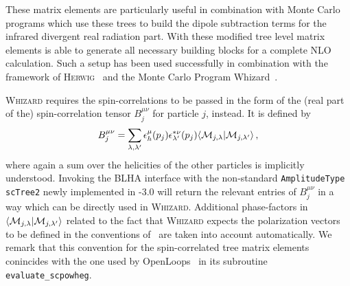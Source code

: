 These matrix elements are particularly useful in combination with Monte Carlo programs which use these trees to build the dipole subtraction terms for the infrared divergent real radiation part. With these modified tree level matrix elements \gosam{} is able to generate
all necessary building blocks for a complete NLO calculation. Such a setup has been used successfully in combination with the framework of
\textsc{Herwig}~\cite{LesHouches2013,Bellm:2013lba,Platzer:2011bc} and the Monte Carlo Program Whizard~\cite{Kilian:2007gr,Moretti:2001zz,Stienemeier:2021cse,Braun:2025hvr}.

\textsc{Whizard} requires the spin-correlations to be passed in the form of the (real  part of the) spin-correlation tensor $B_j^{\mu\nu}$ for particle $j$, instead. It is defined by
\begin{equation}
   B_j^{\mu\nu} = \sum_{\lambda,\lambda'}\epsilon_h^\mu(p_j)\epsilon_{\lambda'}^{*\nu}(p_j)\langle {\cal M}_{j,\lambda}|{\cal M}_{j,\lambda'}\rangle\,,
\end{equation}
where again a sum over the helicities of the other particles is implicitly understood. Invoking the BLHA interface with the non-standard \texttt{AmplitudeType scTree2} newly implemented in \gosam{}-3.0 will return the relevant entries of $B_j^{\mu\nu}$ in a way which can be directly used in \textsc{Whizard}. Additional phase-factors in $\langle {\cal M}_{j,\lambda}|{\cal M}_{j,\lambda'}\rangle$ related to the fact that \textsc{Whizard} expects the polarization vectors to be defined in the conventions of~\cite{Murayama:1992gi} are taken into account automatically. We remark that this convention for the spin-correlated tree matrix elements conincides with the one used by OpenLoops~\cite{Buccioni:2019sur} in its subroutine \texttt{evaluate\_scpowheg}.
